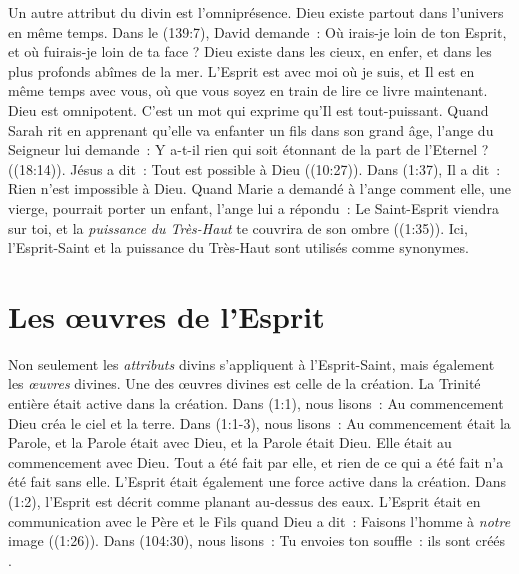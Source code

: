 Un autre attribut du divin est l'omniprésence. Dieu existe partout dans
 l'univers en même temps. Dans le (139:7), David demande~:
 \og Où irais-je loin de ton Esprit, et où fuirais-je loin de ta face ? \fg{}
 Dieu existe dans les cieux, en enfer, et dans les plus profonds abîmes de
 la mer. L'Esprit est avec moi où je suis, et Il est en même temps avec vous,
 où que vous soyez en train de lire ce livre maintenant. Dieu est omnipotent.
 C'est un mot qui exprime qu'Il est tout-puissant. Quand Sarah rit en apprenant
 qu'elle va enfanter un fils dans son grand âge, l'ange du Seigneur lui demande~:
 \og Y a-t-il rien qui soit étonnant de la part de l'Eternel ? \fg{}
 ((18:14)). Jésus a dit~: \og Tout est possible à Dieu \fg{}
 ((10:27)). Dans (1:37), Il a dit~:
 \og Rien n'est impossible à Dieu. \fg{} Quand Marie a demandé à l'ange comment
 elle, une vierge, pourrait porter un enfant, l'ange lui a répondu~:
 \og Le Saint-Esprit viendra sur toi, et la \emph{puissance du Très-Haut} te couvrira
 de son ombre \fg{} ((1:35)). Ici, l'Esprit-Saint et
 la puissance du Très-Haut sont utilisés comme synonymes.

\section*{Les œuvres de l'Esprit}


Non seulement les \emph{attributs} divins s'appliquent à l'Esprit-Saint, mais
 également les \emph{œuvres} divines.
 Une des œuvres divines est celle de la création.
 La Trinité entière était active dans la création.
 Dans (1:1), nous lisons~:
 \og Au commencement Dieu créa le ciel et la terre. \fg{}
 Dans (1:1-3), nous lisons~:
 \og Au commencement était la Parole, et la Parole était avec Dieu,
 et la Parole était Dieu. Elle était au commencement avec Dieu.
 Tout a été fait par elle, et rien de ce qui a été fait n'a été fait
 sans elle. \fg{}
 L'Esprit était également une force active dans la création.
 Dans (1:2), l'Esprit est décrit comme planant au-dessus
 des eaux. L'Esprit était en communication avec le Père et le Fils quand
 Dieu a dit~: \og Faisons l'homme à \emph{notre} image \fg{} ((1:26)).
 Dans (104:30), nous lisons~:
 \og Tu envoies ton souffle~: ils sont créés \fg{}
 .

